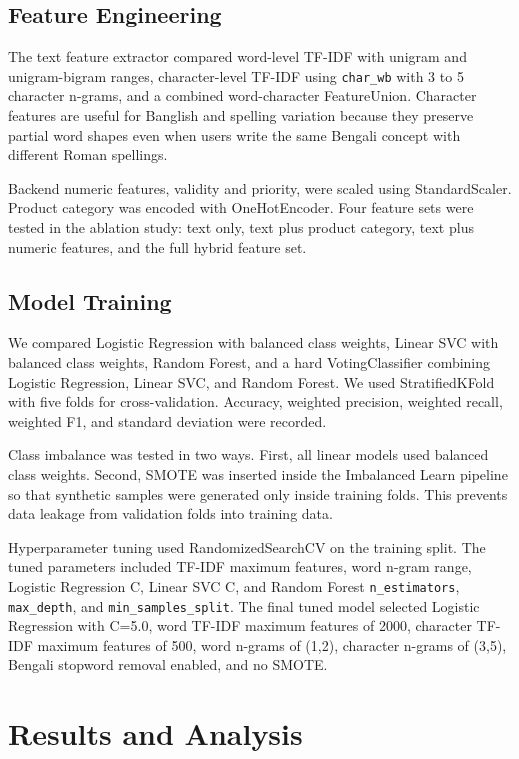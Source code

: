 \documentclass[a4paper,fleqn]{cas-dc}
\begin{document}
\subsection{Feature Engineering}
The text feature extractor compared word-level TF-IDF with unigram and unigram-bigram ranges, character-level TF-IDF using \texttt{char\_wb} with 3 to 5 character n-grams, and a combined word-character FeatureUnion. Character features are useful for Banglish and spelling variation because they preserve partial word shapes even when users write the same Bengali concept with different Roman spellings.

Backend numeric features, validity and priority, were scaled using StandardScaler. Product category was encoded with OneHotEncoder. Four feature sets were tested in the ablation study: text only, text plus product category, text plus numeric features, and the full hybrid feature set.

\subsection{Model Training}
We compared Logistic Regression with balanced class weights, Linear SVC with balanced class weights, Random Forest, and a hard VotingClassifier combining Logistic Regression, Linear SVC, and Random Forest. We used StratifiedKFold with five folds for cross-validation. Accuracy, weighted precision, weighted recall, weighted F1, and standard deviation were recorded.

Class imbalance was tested in two ways. First, all linear models used balanced class weights. Second, SMOTE was inserted inside the Imbalanced Learn pipeline so that synthetic samples were generated only inside training folds. This prevents data leakage from validation folds into training data.

Hyperparameter tuning used RandomizedSearchCV on the training split. The tuned parameters included TF-IDF maximum features, word n-gram range, Logistic Regression C, Linear SVC C, and Random Forest \texttt{n\_estimators}, \texttt{max\_depth}, and \texttt{min\_samples\_split}. The final tuned model selected Logistic Regression with C=5.0, word TF-IDF maximum features of 2000, character TF-IDF maximum features of 500, word n-grams of (1,2), character n-grams of (3,5), Bengali stopword removal enabled, and no SMOTE.

\section{Results and Analysis}
\end{document}
